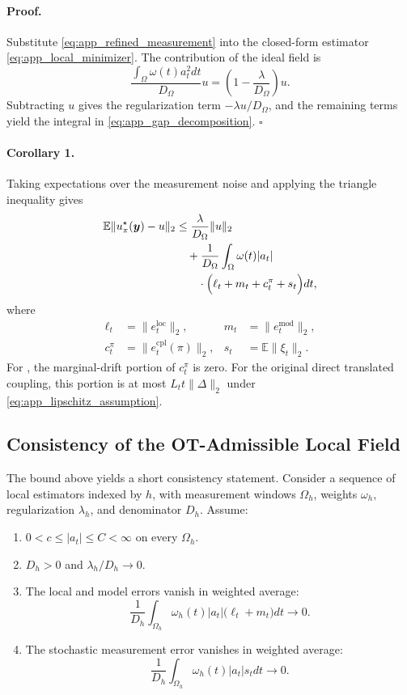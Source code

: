 \paragraph{Proof.}
Substitute \eqref{eq:app_refined_measurement} into the closed-form estimator \eqref{eq:app_local_minimizer}.
The contribution of the ideal field is
\[
    \frac{\int_\Omega\omega(t)a_t^2dt}{D_\Omega}u
    =
    \left(1-\frac{\lambda}{D_\Omega}\right)u.
\]
Subtracting $u$ gives the regularization term $-\lambda u/D_\Omega$, and the remaining terms yield the integral in \eqref{eq:app_gap_decomposition}.
\hfill$\square$

\paragraph{Corollary 1.}
Taking expectations over the measurement noise and applying the triangle inequality gives
\begin{equation}
    \label{eq:app_expected_gap_bound}
    \begin{aligned}
    \mathbb{E}\|u_\pi^\star(\boldsymbol{y})-u\|_2
    &\le
    \frac{\lambda}{D_\Omega}\|u\|_2
    \\
    &\quad+
    \frac{1}{D_\Omega}
    \int_\Omega
    \omega(t)|a_t|
    \\
    &\qquad\cdot
    \Big(
    \ell_t+m_t+c_t^\pi+s_t
    \Big)dt,
    \end{aligned}
\end{equation}
where
\[
    \begin{aligned}
    \ell_t&=\|e_t^{\mathrm{loc}}\|_2,
    &m_t&=\|e_t^{\mathrm{mod}}\|_2,\\
    c_t^\pi&=\|e_t^{\mathrm{cpl}}(\pi)\|_2,
    &s_t&=\mathbb{E}\|\xi_t\|_2.
    \end{aligned}
\]
For \methodplus, the marginal-drift portion of $c_t^\pi$ is zero.
For the original direct translated coupling, this portion is at most $L_t t\|\Delta\|_2$ under \eqref{eq:app_lipschitz_assumption}.

\subsection{Consistency of the OT-Admissible Local Field}

The bound above yields a short consistency statement.
Consider a sequence of local estimators indexed by $h$, with measurement windows $\Omega_h$, weights $\omega_h$, regularization $\lambda_h$, and denominator $D_h$.
Assume:
\begin{enumerate}
    \item $0<c\le |a_t|\le C<\infty$ on every $\Omega_h$.
    \item $D_h>0$ and $\lambda_h/D_h\rightarrow 0$.
    \item The local and model errors vanish in weighted average:
    \[
    \frac{1}{D_h}
    \int_{\Omega_h}
    \omega_h(t)|a_t|
    \big(\ell_t+m_t\big)dt
    \rightarrow 0.
    \]
    \item The stochastic measurement error vanishes in weighted average:
    \[
    \frac{1}{D_h}
    \int_{\Omega_h}
    \omega_h(t)|a_t|s_tdt
    \rightarrow 0.
    \]
\end{enumerate}

